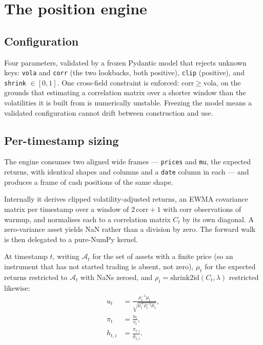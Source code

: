 \documentclass[11pt,a4paper]{article}
\newcommand{\code}[1]{\texttt{#1}}
\begin{document}
\section{The position engine}

\subsection{Configuration}

Four parameters, validated by a frozen Pydantic model that rejects unknown keys:
\code{vola} and \code{corr} (the two lookbacks, both positive), \code{clip}
(positive), and \code{shrink} $\in [0,1]$. One cross-field constraint is
enforced: $\mathrm{corr} \ge \mathrm{vola}$, on the grounds that estimating a
correlation matrix over a shorter window than the volatilities it is built from
is numerically unstable. Freezing the model means a validated configuration
cannot drift between construction and use.

\subsection{Per-timestamp sizing}

The engine consumes two aligned wide frames --- \code{prices} and \code{mu}, the
expected returns, with identical shapes and columns and a \code{date} column in
each --- and produces a frame of cash positions of the same shape.

Internally it derives clipped volatility-adjusted returns, an EWMA covariance
matrix per timestamp over a window of $2\,\mathrm{corr} + 1$ with $\mathrm{corr}$
observations of warmup, and normalises each to a correlation matrix $C_t$ by its
own diagonal. A zero-variance asset yields NaN rather than a division by zero.
The forward walk is then delegated to a pure-NumPy kernel.

At timestamp $t$, writing $\mathcal{A}_t$ for the set of assets with a finite
price (so an instrument that has not started trading is absent, not zero),
$\mu_t$ for the expected returns restricted to $\mathcal{A}_t$ with NaNs zeroed,
and $\rho_t = \mathrm{shrink2id}(C_t, \lambda)$ restricted likewise:
\begin{align}
  u_t &= \frac{\rho_t^{-1} \mu_t}{\sqrt{\mu_t^{\top} \rho_t^{-1} \mu_t}},
    \label{eq:risk} \\
  \pi_t &= \frac{u_t}{v_t},
    \label{eq:scale} \\
  h_{t,i} &= \frac{\pi_{t,i}}{\hat\sigma_{t,i}} .
    \label{eq:cash}
\end{align}
\end{document}
